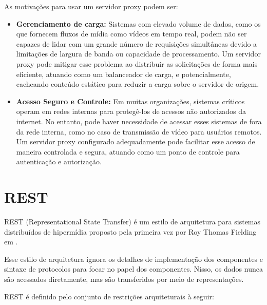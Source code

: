\documentclass[12pt, %
openright, 
oneside, %
a4paper,    %
brazil]{facom-ufu-abntex2}
\begin{document}
As motivações para usar um servidor proxy podem ser:

\begin{itemize}
	\item \textbf{Gerenciamento de carga:} Sistemas com elevado volume de
	      dados, como os que fornecem fluxos de mídia como vídeos em tempo
	      real, podem não ser capazes de lidar com um grande número de requisições
	      simultâneas devido a limitações de largura de banda ou capacidade de
	      processamento. Um servidor proxy pode mitigar esse problema ao distribuir as
	      solicitações de forma mais eficiente, atuando como um balanceador de carga, e
	      potencialmente, cacheando conteúdo estático para reduzir a carga sobre o
	      servidor de origem.
	\item \textbf{Acesso Seguro e Controle:} Em muitas organizações,
	      sistemas críticos operam em redes internas para protegê-los de
	      acessos não autorizados da internet. No entanto, pode haver necessidade de
	      acessar esses sistemas de fora da rede interna, como no caso de transmissão de
	      vídeo para usuários remotos. Um servidor proxy configurado adequadamente pode
	      facilitar esse acesso de maneira controlada e segura, atuando como um ponto de
	      controle para autenticação e autorização.

\end{itemize}

\section{REST}

REST (Representational State Transfer) é um estilo de arquitetura para sistemas
distribuídos de hipermídia proposto pela primeira vez por Roy Thomas Fielding
em .

Esse estilo de arquitetura ignora os detalhes de implementação dos componentes
e sintaxe de protocolos para focar no papel dos componentes. Nisso, os dados
nunca são acessados diretamente, mas são transferidos por meio de
representações.

REST é definido pelo conjunto de restrições arquiteturais à seguir:
\end{document}
